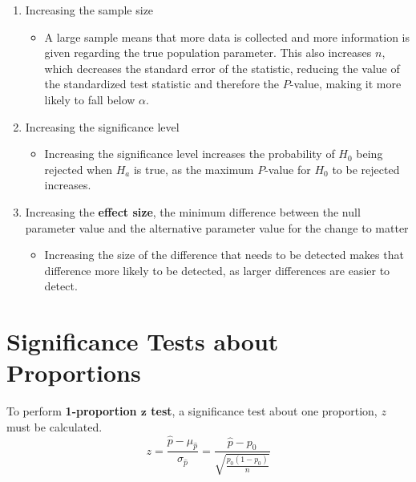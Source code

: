 \documentclass[../AP_Statistics.tex]{subfiles}
\begin{document}
		\begin{enumerate}
			\item 
				Increasing the sample size
				\begin{itemize}
					\item 
						A large sample means that more data is collected and more information is given regarding the true population parameter. This also increases $n$, which decreases the standard error of the statistic, reducing the value of the standardized test statistic and therefore the $P$-value, making it more likely to fall below $\alpha$.
				\end{itemize}
			\item 
				Increasing the significance level
				\begin{itemize}
					\item 
						Increasing the significance level increases the probability of $H_0$ being rejected when $H_a$ is true, as the maximum $P$-value for $H_0$ to be rejected increases.
				\end{itemize}
			\item 
				Increasing the \textbf{effect size}, the minimum difference between the null parameter value and the alternative parameter value for the change to matter
				\begin{itemize}
					\item 
						Increasing the size of the difference that needs to be detected makes that difference more likely to be detected, as larger differences are easier to detect.
				\end{itemize}
		\end{enumerate}
		\section{Significance Tests about Proportions}
			To perform \textbf{1-proportion $\pmb{z}$ test}, a significance test about one proportion, $z$ must be calculated. \\
			\[z = \frac{\hat{p} - \mu_{\hat{p}}}{\sigma_{\hat{p}}} = \frac{\hat{p} - p_0}{\sqrt{\frac{p_0(1 - p_0)}{n}}}\]			
\end{document}
